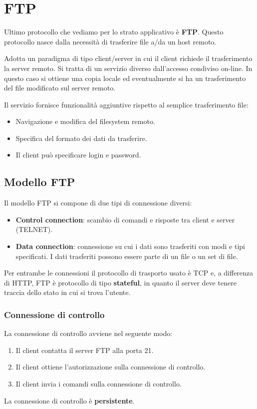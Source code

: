 \section{FTP}
Ultimo protocollo che vediamo per lo strato applicativo è \textbf{FTP}. Questo protocollo nasce
dalla necessità di trasferire file a/da un host remoto.

Adotta un paradigma di tipo client/server in cui il client richiede il trasferimento la server
remoto. Si tratta di un servizio diverso dall'accesso condiviso on-line. In questo caso si ottiene
una copia locale ed eventualmente si ha un trasferimento del file modificato sul server remoto.

Il servizio fornisce funzionalità aggiuntive rispetto al semplice trasferimento file:
\begin{itemize}
	\item Navigazione e modifica del filesystem remoto.
	\item Specifica del formato dei dati da trasferire.
	\item Il client può specificare login e password.
\end{itemize}

\subsection{Modello FTP}
Il modello FTP si compone di due tipi di connessione diversi:
\begin{itemize}
	\item \textbf{Control connection}: scambio di comandi e risposte tra client e server (TELNET).
	\item \textbf{Data connection}: connessione su cui i dati sono trasferiti con modi e tipi
		specificati. I dati trasferiti possono essere parte di un file o un set di file.
\end{itemize}
Per entrambe le connessioni il protocollo di trasporto usato è TCP e, a differenza di HTTP, FTP è
protocollo di tipo \textbf{stateful}, in quanto il server deve tenere traccia dello stato in cui
si trova l'utente.

\subsubsection{Connessione di controllo}
La connessione di controllo avviene nel seguente modo:
\begin{enumerate}
	\item Il client contatta il server FTP alla porta 21.
	\item Il client ottiene l'autorizzazione sulla connessione di controllo.
	\item Il client invia i comandi sulla connessione di controllo.
\end{enumerate}
La connessione di controllo è \textbf{persistente}.

